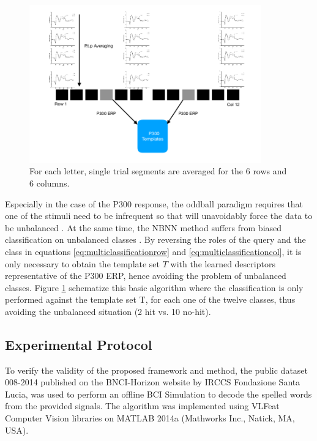 \documentclass[entropy,article,submit,moreauthors,pdftex,10pt,a4paper]{mdpi}
\begin{document}
\begin{figure}[H]
\centering
\includegraphics[width=10cm]{classification.png}
\caption{For each letter, single trial segments are averaged for the 6 rows and 6 columns.}
\label{fig:classification}
\end{figure}

Especially in the case of the P300 response, the oddball paradigm requires that one of the stimuli need to be infrequent so that will unavoidably force the data to be unbalanced \citep{Tibon2015}.  At the same time, the NBNN method suffers from biased classification on unbalanced classes \citep{Fornoni2014}.  By reversing the roles of the query and the class in equations \ref{eq:multiclassificationrow} and \ref{eq:multiclassificationcol}, it is only necessary to obtain the template set $ T $ with the learned descriptors representative of the P300 ERP, hence avoiding the problem of unbalanced classes. Figure \ref{fig:classification} schematize this basic algorithm where the classification is only performed against the template set T, for each one of the twelve classes, thus avoiding the unbalanced situation (2 hit vs. 10 no-hit).


\subsection{Experimental Protocol} \label{Protocol}

To verify the validity of the proposed framework and method, the public dataset 008-2014  \citep{Riccio2013} published on the BNCI-Horizon website \citep{Brunner2014} by  IRCCS Fondazione Santa Lucia, was used to perform an offline BCI Simulation to decode the spelled words from the provided signals.  The algorithm was implemented using  VLFeat  \citep{Vedaldi2010} Computer Vision libraries on MATLAB 2014a (Mathworks Inc., Natick, MA, USA). 
\end{document}
